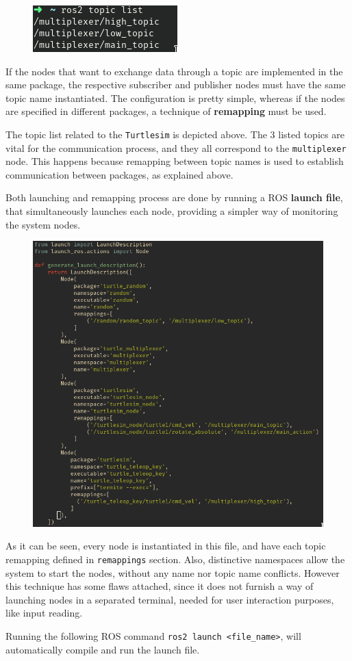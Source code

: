 \begin{figure}[H]
        \centering
         \includegraphics[width=0.3\linewidth]{images/ts_topiclist.png}
\end{figure}
            
If the nodes that want to exchange data through a topic are implemented in the same package, the respective subscriber and publisher nodes must have the same topic name instantiated. The configuration is pretty simple, whereas if the nodes are specified in different packages, a technique of \textbf{remapping} must be used.

The topic list related to the \texttt{Turtlesim} is depicted above. The 3 listed topics are vital for the communication process, and they all correspond to the \texttt{multiplexer} node. This happens because remapping between topic names is used to establish communication between packages, as explained above.

Both launching and remapping process are done by running a ROS \textbf{launch file}, that simultaneously launches each node, providing a simpler way of monitoring the system nodes. 

\begin{figure}[H]
        \centering
         \includegraphics[width=0.3\linewidth]{images/ts_launch_file.png}
\end{figure}

As it can be seen, every node is instantiated in this file, and have each topic remapping defined in \texttt{remappings} section. Also, distinctive namespaces allow the system to start the nodes, without any name nor topic name conflicts. However this technique has some flaws attached, since it does not furnish a way of launching nodes in a separated terminal, needed for user interaction purposes, like input reading.

Running the following ROS command \texttt{ros2 launch <file\_name>}, will automatically compile and run the launch file.

